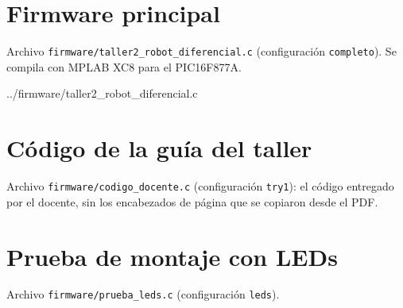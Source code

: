 \section{Firmware principal}
\label{anx:codigo}

Archivo \texttt{firmware/taller2\_robot\_diferencial.c} (configuración
\texttt{completo}). Se compila con MPLAB XC8 para el PIC16F877A.


{../firmware/taller2_robot_diferencial.c}

\section{Código de la guía del taller}
\label{anx:docente}

Archivo \texttt{firmware/codigo\_docente.c} (configuración \texttt{try1}): el
código entregado por el docente, sin los encabezados de página que se
copiaron desde el PDF.



\section{Prueba de montaje con LEDs}
\label{anx:leds}

Archivo \texttt{firmware/prueba\_leds.c} (configuración \texttt{leds}).


